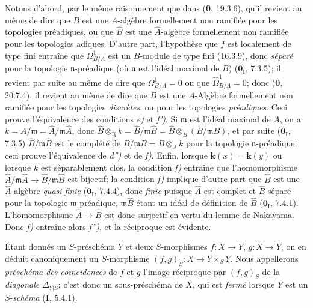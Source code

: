 Notons d'abord, par le même raisonnement que dans (\textbf{0}, 19.3.6), qu'il revient au même de dire que $B$ est une $A$-algèbre formellement non ramifiée pour les topologies préadiques, ou que $\widehat{B}$ est une $\widehat{A}$-algèbre formellement non ramifiée pour les topologies adiques. D'autre part, l'hypothèse que $f$ est localement de type fini entraîne que $\Omega^1_{B/A}$
est un $B$-module de type fini (16.3.9), donc \emph{séparé} pour la topologie $\mathfrak n$-préadique (où $\mathfrak n$ est l'idéal maximal de $B$) ($\mathbf{0}_{\mathrm I}$, 7.3.5); il revient par suite au même de dire que $\Omega^1_{B/A}=0$ ou que $\widehat{\Omega}^1_{B/A}=0$; donc (\textbf{0}, 20.7.4), il revient au même de dire que $B$ est une $A$-Algèbre formellement non ramifiée pour les topologies \emph{discrètes}, ou pour les topologies \emph{préadiques}. Ceci prouve l'équivalence des conditions \emph{e)} et \emph{f')}. Si $\mathfrak m$ est l'idéal maximal de $A$, on a $k=A/\mathfrak m=\widehat A/\mathfrak m\widehat A$, donc $\widehat B\otimes_{\widehat A}k=\widehat B/\mathfrak m\widehat B=\widehat B\otimes_B(B/\mathfrak m B)$,
et par suite ($\mathbf{0}_{\mathrm I}$, 7.3.5) $\widehat B/\mathfrak m\widehat B$ est le complété de $B/\mathfrak m B=B\otimes_A k$ pour la topologie $\mathfrak n$-préadique; ceci prouve l'équivalence de \emph{d'')} et de \emph{f)}. Enfin, lorsque $\boldsymbol{k}(x)=\boldsymbol{k}(y)$ ou lorsque $k$ est séparablement clos, la condition \emph{f)} entraîne que l'homomorphisme $\widehat A/\mathfrak m\widehat A\to\widehat B/\mathfrak m\widehat B$ est bijectif; la condition \emph{f)} implique d'autre part que $\widehat B$ est une $\widehat A$-algèbre \emph{quasi-finie} ($\mathbf{0}_{\mathrm I}$, 7.4.4), donc \emph{finie} puisque $\widehat A$ est complet et $\widehat B$ séparé pour la topologie $\mathfrak m$-préadique, $\mathfrak m\widehat B$ étant un idéal de définition de $\widehat B$ ($\mathbf{0}_{\mathrm I}$, 7.4.1). L'homomorphisme $\widehat A\to\widehat B$ est donc surjectif en vertu du lemme de Nakayama. Donc \emph{f)} entraîne alors \emph{f'')}, et la réciproque est évidente.

\begin{env}[17.4.5]
Étant donnés un $S$-préschéma $Y$ et deux $S$-morphismes $f:X\to Y$, $g:X\to Y$, on en déduit canoniquement un $S$-morphisme $(f,g)_S:X\to Y\times_S Y$. Nous appellerons \emph{préschéma des coïncidences} de $f$ et $g$ l'image réciproque par $(f,g)_S$ de la \emph{diagonale} $\Delta_{Y|S}$; c'est donc un sous-préschéma de $X$, qui est \emph{fermé} lorsque $Y$ est un $S$-\emph{schéma} (\textbf{I}, 5.4.1).
\end{env}

